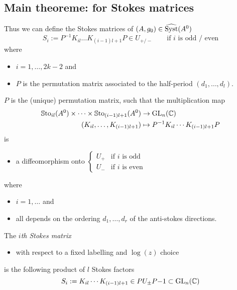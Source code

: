 \subsection{Main theoreme: for Stokes matrices}
\begin{paracol}{2} %
  \switchcolumn %
  Thus we can define the Stokes matrices of $(A,g_0)\in\widehat{\operatorname{Syst}}(A^0)$
  \[
    S_i:=P^{-1}K_{il}\dots K_{(i-1)l+1}P\in U_{+/-}
    \qquad
    \text{if } i \text{ is odd / even}
  \]
  where
  \begin{itemize}
    \item $i=1,\dots,2k-2$ and
    \item $P$ is the permutation matrix associated to the half-period
      $(d_1,\dots,d_l)$.
  \end{itemize}
\end{paracol} %
\begin{prop}
  $P$ is the (unique) permutation matrix, such that the multiplication map
  \begin{align*}
    \operatorname{\mathbb{S}to}_{il}(A^0)\times\dots\times\operatorname{\mathbb{S}to}_{(i-1)l+1}(A^0)
    &\to \operatorname{GL}_n(\mathbb{C})
  \\(K_{il},\dots,K_{(i-1)l+1})&\mapsto P^{-1}K_{il}\cdots K_{(i-1)l+1}P
  \end{align*}
  is
  \begin{itemize}
    \item a diffeomorphism onto
      $
      \begin{cases}
        U_+ & \text{if $i$ is odd}
      \\U_- & \text{if $i$ is even}
      \end{cases}
      $
  \end{itemize}
  where
  \begin{itemize}
    \item $i=1,\dots$ and
    \item all depends on the ordering $d_1,\dots,d_r$ of the anti-stokes directions.
  \end{itemize}
  \begin{defn}
    The \emph{$i$th Stokes matrix}
    \begin{itemize}
      \item with respect to a fixed labelling and $\log(z)$ choice
    \end{itemize}
    is the following product of $l$ Stokes factors
    \[
      S_i:=K_{il}\cdots K_{(i-1)l+1}\in PU_{\pm}P{-1}\subset\operatorname{GL}_n(\mathbb{C})
    \]
  \end{defn}
\end{prop}
